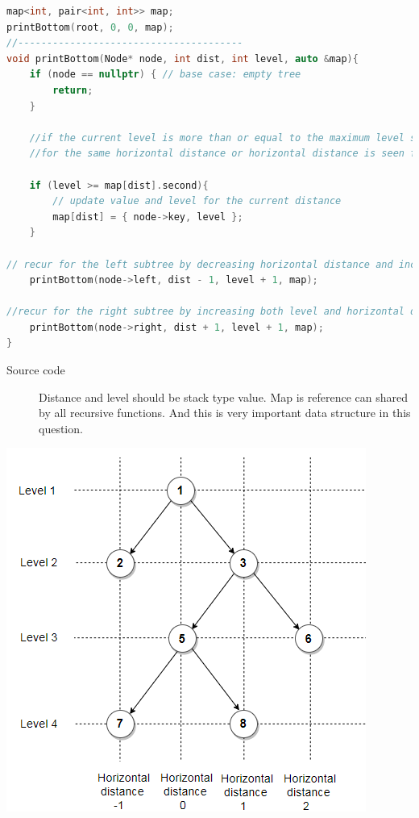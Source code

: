 \documentclass[a4paper,11pt,twoside]{book}
\begin{document}
\begin{lstlisting}[frame=single, language=c++]
map<int, pair<int, int>> map;
printBottom(root, 0, 0, map);
//---------------------------------------	
void printBottom(Node* node, int dist, int level, auto &map){
	if (node == nullptr) { // base case: empty tree
		return;
	}
	
	//if the current level is more than or equal to the maximum level seen so far 
	//for the same horizontal distance or horizontal distance is seen for the first time, update the map
	
	if (level >= map[dist].second){
		// update value and level for the current distance
		map[dist] = { node->key, level };
	}
	
// recur for the left subtree by decreasing horizontal distance and increasing level by 1
	printBottom(node->left, dist - 1, level + 1, map);
	
//recur for the right subtree by increasing both level and horizontal distance by 1
	printBottom(node->right, dist + 1, level + 1, map);
}
\end{lstlisting}
\begin{description}
	\item[Source code] Distance and level should be stack type value. Map is reference can shared by all recursive functions. And this is very important data structure in this question. 
\end{description}
\begin{center}
	\includegraphics[scale=0.56]{pics/ht.png} 
\end{center}
\end{document}
